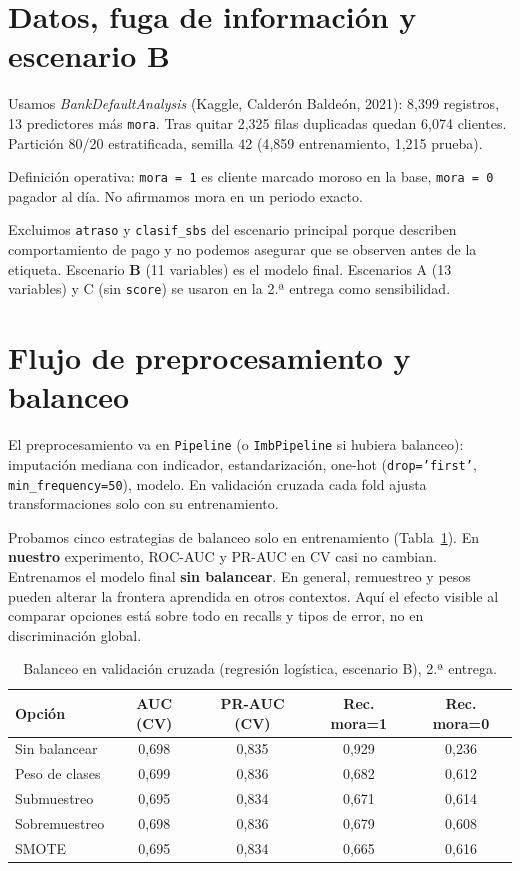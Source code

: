 \documentclass[11pt]{article}
\begin{document}
\section{Datos, fuga de información y escenario B}

Usamos \textit{BankDefaultAnalysis} (Kaggle, Calderón Baldeón, 2021): 8{,}399 registros, 13 predictores más \texttt{mora}. Tras quitar 2{,}325 filas duplicadas quedan 6{,}074 clientes. Partición 80/20 estratificada, semilla 42 (4{,}859 entrenamiento, 1{,}215 prueba).

Definición operativa: \texttt{mora = 1} es cliente marcado moroso en la base, \texttt{mora = 0} pagador al día. No afirmamos mora en un periodo exacto.

Excluimos \texttt{atraso} y \texttt{clasif\_sbs} del escenario principal porque describen comportamiento de pago y no podemos asegurar que se observen antes de la etiqueta. Escenario \textbf{B} (11 variables) es el modelo final. Escenarios A (13 variables) y C (sin \texttt{score}) se usaron en la 2.ª entrega como sensibilidad.

\section{Flujo de preprocesamiento y balanceo}

El preprocesamiento va en \texttt{Pipeline} (o \texttt{ImbPipeline} si hubiera balanceo): imputación mediana con indicador, estandarización, one-hot (\texttt{drop='first'}, \texttt{min\_frequency=50}), modelo. En validación cruzada cada fold ajusta transformaciones solo con su entrenamiento.

Probamos cinco estrategias de balanceo solo en entrenamiento (Tabla~\ref{tab:balanceo}). En \textbf{nuestro} experimento, ROC-AUC y PR-AUC en CV casi no cambian. Entrenamos el modelo final \textbf{sin balancear}. En general, remuestreo y pesos pueden alterar la frontera aprendida en otros contextos. Aquí el efecto visible al comparar opciones está sobre todo en recalls y tipos de error, no en discriminación global.

\begin{table}[H]
\centering
\caption{Balanceo en validación cruzada (regresión logística, escenario B), 2.ª entrega.}
\label{tab:balanceo}
\small
\begin{tabular}{@{}lcccc@{}}
\toprule
\textbf{Opción} & \textbf{AUC (CV)} & \textbf{PR-AUC (CV)} & \textbf{Rec. mora=1} & \textbf{Rec. mora=0} \\
\midrule
Sin balancear & 0,698 & 0,835 & 0,929 & 0,236 \\
Peso de clases & 0,699 & 0,836 & 0,682 & 0,612 \\
Submuestreo & 0,695 & 0,834 & 0,671 & 0,614 \\
Sobremuestreo & 0,698 & 0,836 & 0,679 & 0,608 \\
SMOTE & 0,695 & 0,834 & 0,665 & 0,616 \\
\bottomrule
\end{tabular}
\end{table}
\end{document}
